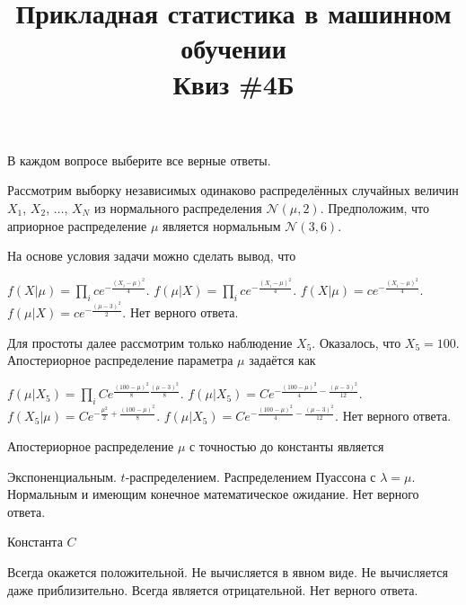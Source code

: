 \documentclass[10pt, a4paper]{exam}
\title{{\normalsize Прикладная статистика в машинном обучении} \\ \vspace{0.5em} Квиз \#4Б}
\author{\rule{15cm}{0.4pt}}
\begin{document}
	
	\maketitle
	
	\begin{center}
		В каждом вопросе выберите все верные ответы.
	\end{center}
	
	Рассмотрим выборку независимых одинаково распределённых случайных величин $X_1$, $X_2$, $\ldots$, $X_N$ из нормального распределения $\mathcal{N}(\mu, 2)$. Предположим, что априорное распределение $\mu$ является нормальным $\mathcal{N}(3, 6)$.
	
	\begin{questions}
		\question На основе условия задачи можно сделать вывод, что
		\begin{choices}
			\choice $f(X | \mu) = \prod_i ce^{-\frac{(X_i - \mu)^2}{4}}$.
			\choice $f(\mu | X) = \prod_i ce^{-\frac{(X_i - \mu)^2}{4}}$.
			\choice $f(X | \mu) = ce^{-\frac{(X_i - \mu)^2}{4}}$.
			\choice $f(\mu | X) = ce^{-\frac{(\mu - 3)^2}{2}}$.
			\choice Нет верного ответа.
		\end{choices}
	
		\question Для простоты далее рассмотрим только наблюдение $X_5$. Оказалось, что $X_5 = 100$. Апостериорное распределение параметра $\mu$ задаётся как
		\begin{choices}
			\choice $f(\mu | X_{5}) = \prod_i Ce^{\frac{(100 - \mu)^2}{8}  \frac{(\mu - 3)^2}{8}}$.
			\choice$f(\mu | X_{5}) = Ce^{-\frac{(100 - \mu)^2}{4} - \frac{(\mu - 3)^2}{12}}$.
			\choice $f(X_5 | \mu) = Ce^{-\frac{\mu^2}{2} + \frac{(100 - \mu)^2}{8}}$.
			\choice$f(\mu | X_{5}) = Ce^{-\frac{(100 - \mu)^2}{4} - \frac{(\mu - 3)^2}{12}}$.
			\choice Нет верного ответа.
		\end{choices}
	
		\question Апостериорное распределение $\mu$ с точностью до константы является 
		\begin{choices}
			\choice Экспоненциальным.
			\choice $t$-распределением.
			\choice Распределением Пуассона с $\lambda = \mu$.
			\choice Нормальным и имеющим конечное математическое ожидание.
			\choice Нет верного ответа.
		\end{choices}
		
		\question Константа $C$
		\begin{choices}
			\choice Всегда окажется положительной.
			\choice Не вычисляется в явном виде.
			\choice Не вычисляется даже приблизительно.
			\choice Всегда является отрицательной.
			\choice Нет верного ответа.
		\end{choices}
	

\end{questions}
\end{document}
